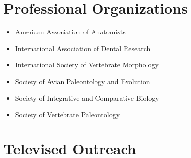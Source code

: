 \documentclass[11pt, a4paper]{awesome-cv}
\providecommand{\tightlist}{%
	\setlength{\itemsep}{0pt}\setlength{\parskip}{0pt}}
\begin{document}
\hypertarget{professional-organizations}{%
\section{Professional Organizations}\label{professional-organizations}}

\begin{itemize}
\tightlist
\item
  American Association of Anatomists
\item
  International Association of Dental Research
\item
  International Society of Vertebrate Morphology
\item
  Society of Avian Paleontology and Evolution
\item
  Society of Integrative and Comparative Biology
\item
  Society of Vertebrate Paleontology
\end{itemize}

\hypertarget{televised-outreach}{%
\section{Televised Outreach}\label{televised-outreach}}

\end{document}
